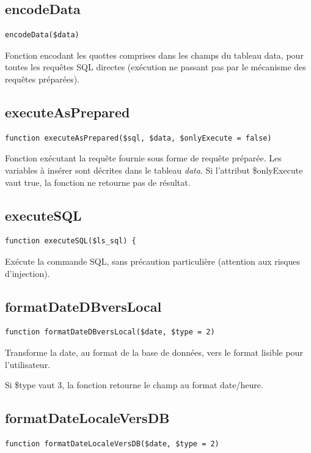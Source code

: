 \subsection{encodeData}

\begin{lstlisting}
encodeData($data)
\end{lstlisting}

Fonction encodant les quottes comprises dans les champs du tableau data, pour toutes les requêtes SQL directes (exécution ne passant pas par le mécanisme des requêtes préparées).

\subsection{executeAsPrepared}

\begin{lstlisting}
function executeAsPrepared($sql, $data, $onlyExecute = false) 
\end{lstlisting}

Fonction exécutant la requête fournie sous forme de requête préparée. Les variables à insérer sont décrites dans le tableau \textit{data}. Si l'attribut \$onlyExecute vaut true, la fonction ne retourne pas de résultat.

\subsection{executeSQL}

\begin{lstlisting}
function executeSQL($ls_sql) {
\end{lstlisting}

Exécute la commande SQL, sans précaution particulière (attention aux risques d'injection).

\subsection{formatDateDBversLocal}

\begin{lstlisting}
function formatDateDBversLocal($date, $type = 2)
\end{lstlisting}

Transforme la date, au format de la base de données, vers le format lisible pour l'utilisateur.

Si \$type vaut 3, la fonction retourne le champ au format date/heure.

\subsection{formatDateLocaleVersDB}
\begin{lstlisting}
function formatDateLocaleVersDB($date, $type = 2)
\end{lstlisting}


